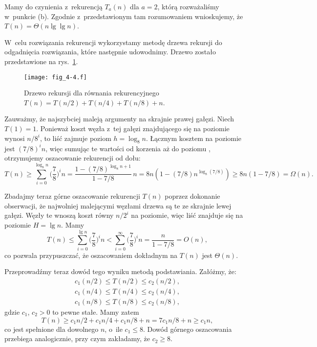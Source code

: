 \subproblem %
Mamy do czynienia z~rekurencją $T_a(n)$ dla $a=2$, którą rozważaliśmy w~punkcie (b).
Zgodnie z~przedstawionym tam rozumowaniem wnioskujemy, że $T(n)=\Theta(n\lg\lg n)$.

\subproblem %
W~celu rozwiązania rekurencji wykorzystamy metodę drzewa rekursji do odgadnięcia rozwiązania, które następnie udowodnimy.
Drzewo zostało przedstawione na rys.\ \ref{fig:4-4f}.
\begin{figure}[ht]
	\begin{center}
		\texttt{[image: fig\_4-4.f]}
	\end{center}
	\caption{Drzewo rekursji dla równania rekurencyjnego $T(n)=T(n/2)+T(n/4)+T(n/8)+n$.} \label{fig:4-4f}
\end{figure}

Zauważmy, że najszybciej maleją argumenty na skrajnie prawej gałęzi.
Niech $T(1)=1$.
Ponieważ koszt węzła z~tej gałęzi znajdującego się na  poziomie wynosi $n/8^i$, to liść zajmuje poziom $h=\log_8n$.
Łącznym kosztem na  poziomie jest $(7/8)^in$, więc sumując te wartości od korzenia aż do poziomu , otrzymujemy oszacowanie rekurencji od dołu:
\[
	T(n) \ge \sum_{i=0}^{\log_8n}\biggl(\frac{7}{8}\biggr)^in = \frac{1-(7/8)^{\log_8n+1}}{1-7/8}\,n = 8n(1-(7/8)n^{\log_8(7/8)}) \ge 8n(1-7/8) = \Omega(n).
\]

Zbadajmy teraz górne oszacowanie rekurencji $T(n)$ poprzez dokonanie obserwacji, że najwolniej malejącymi węzłami drzewa są te ze skrajnie lewej gałęzi.
Węzły te wnoszą koszt równy $n/2^i$ na  poziomie, więc liść znajduje się na poziomie $H=\lg n$.
Mamy
\[
	T(n) \le \sum_{i=0}^{\lg n}\biggl(\frac{7}{8}\biggr)^in < \sum_{i=0}^\infty\biggl(\frac{7}{8}\biggr)^in = \frac{n}{1-7/8} = O(n),
\]
co pozwala przypuszczać, że oszacowaniem dokładnym na $T(n)$ jest $\Theta(n)$.

Przeprowadźmy teraz dowód tego wyniku metodą podstawiania.
Załóżmy, że:
\begin{gather*}
	c_1(n/2) \le T(n/2) \le c_2(n/2), \\
	c_1(n/4) \le T(n/4) \le c_2(n/4), \\
	c_1(n/8) \le T(n/8) \le c_2(n/8),
\end{gather*}
gdzie $c_1$, $c_2>0$ to pewne stałe.
Mamy zatem
\[
	T(n) \ge c_1n/2+c_1n/4+c_1n/8+n = 7c_1n/8+n \ge c_1n,
\]
co jest spełnione dla dowolnego $n$, o~ile $c_1\le8$.
Dowód górnego oszacowania przebiega analogicznie, przy czym zakładamy, że $c_2\ge8$.

